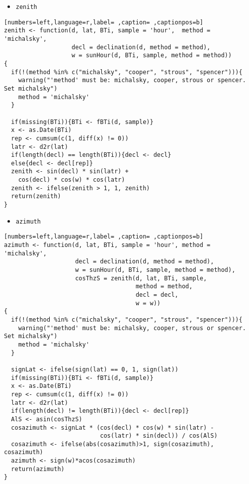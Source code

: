 \begin{itemize}
\item \texttt{zenith}
\end{itemize}
\begin{lstlisting}[numbers=left,language=r,label= ,caption= ,captionpos=b]
zenith <- function(d, lat, BTi, sample = 'hour',  method = 'michalsky',
                   decl = declination(d, method = method),
                   w = sunHour(d, BTi, sample, method = method))
{
  if(!(method %in% c("michalsky", "cooper", "strous", "spencer"))){
    warning("'method' must be: michalsky, cooper, strous or spencer.
Set michalsky")
    method = 'michalsky'
  }

  if(missing(BTi)){BTi <- fBTi(d, sample)}
  x <- as.Date(BTi)
  rep <- cumsum(c(1, diff(x) != 0))
  latr <- d2r(lat)
  if(length(decl) == length(BTi)){decl <- decl}
  else{decl <- decl[rep]}
  zenith <- sin(decl) * sin(latr) +
    cos(decl) * cos(w) * cos(latr)
  zenith <- ifelse(zenith > 1, 1, zenith)
  return(zenith)
}
\end{lstlisting}
\begin{itemize}
\item \texttt{azimuth}
\end{itemize}
\begin{lstlisting}[numbers=left,language=r,label= ,caption= ,captionpos=b]
azimuth <- function(d, lat, BTi, sample = 'hour', method = 'michalsky',
                    decl = declination(d, method = method),
                    w = sunHour(d, BTi, sample, method = method),
                    cosThzS = zenith(d, lat, BTi, sample,
                                     method = method,
                                     decl = decl,
                                     w = w))
{
  if(!(method %in% c("michalsky", "cooper", "strous", "spencer"))){
    warning("'method' must be: michalsky, cooper, strous or spencer.
Set michalsky")
    method = 'michalsky'
  }

  signLat <- ifelse(sign(lat) == 0, 1, sign(lat)) 
  if(missing(BTi)){BTi <- fBTi(d, sample)}
  x <- as.Date(BTi)
  rep <- cumsum(c(1, diff(x) != 0))
  latr <- d2r(lat)
  if(length(decl) != length(BTi)){decl <- decl[rep]}
  AlS <- asin(cosThzS)
  cosazimuth <- signLat * (cos(decl) * cos(w) * sin(latr) -
                           cos(latr) * sin(decl)) / cos(AlS)
  cosazimuth <- ifelse(abs(cosazimuth)>1, sign(cosazimuth), cosazimuth)
  azimuth <- sign(w)*acos(cosazimuth)
  return(azimuth)
}
\end{lstlisting}
